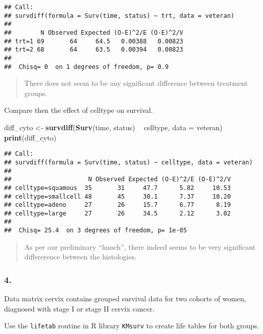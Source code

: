 \documentclass[]{article}
\newenvironment{Shaded}{\begin{snugshade}}{\end{snugshade}}
\newcommand{\KeywordTok}[1]{\textcolor[rgb]{0.13,0.29,0.53}{\textbf{#1}}}
\newcommand{\DataTypeTok}[1]{\textcolor[rgb]{0.13,0.29,0.53}{#1}}
\newcommand{\StringTok}[1]{\textcolor[rgb]{0.31,0.60,0.02}{#1}}
\newcommand{\OperatorTok}[1]{\textcolor[rgb]{0.81,0.36,0.00}{\textbf{#1}}}
\newcommand{\NormalTok}[1]{#1}
\begin{document}
\begin{verbatim}
## Call:
## survdiff(formula = Surv(time, status) ~ trt, data = veteran)
## 
##        N Observed Expected (O-E)^2/E (O-E)^2/V
## trt=1 69       64     64.5   0.00388   0.00823
## trt=2 68       64     63.5   0.00394   0.00823
## 
##  Chisq= 0  on 1 degrees of freedom, p= 0.9
\end{verbatim}

\begin{quote}
There does not seem to be any significant difference between treatment
groups.
\end{quote}

Compare then the effect of celltype on survival.

\begin{Shaded}
\begin{Highlighting}[]
\NormalTok{diff_cyto <-}\StringTok{ }\KeywordTok{survdiff}\NormalTok{(}\KeywordTok{Surv}\NormalTok{(time, status) }\OperatorTok{~}\StringTok{ }\NormalTok{celltype, }\DataTypeTok{data =}\NormalTok{ veteran)}
\KeywordTok{print}\NormalTok{(diff_cyto)}
\end{Highlighting}
\end{Shaded}

\begin{verbatim}
## Call:
## survdiff(formula = Surv(time, status) ~ celltype, data = veteran)
## 
##                     N Observed Expected (O-E)^2/E (O-E)^2/V
## celltype=squamous  35       31     47.7      5.82     10.53
## celltype=smallcell 48       45     30.1      7.37     10.20
## celltype=adeno     27       26     15.7      6.77      8.19
## celltype=large     27       26     34.5      2.12      3.02
## 
##  Chisq= 25.4  on 3 degrees of freedom, p= 1e-05
\end{verbatim}

\begin{quote}
As per our preliminary ``hunch'', there indeed seems to be very
significant differerence between the histologies.
\end{quote}

\subsubsection{4.}\label{section-3}

Data matrix cervix contains grouped survival data for two cohorts of
women, diagnosed with stage I or stage II cervix cancer.

Use the \texttt{lifetab} routine in R library \texttt{KMsurv} to create
life tables for both groups.
\end{document}
